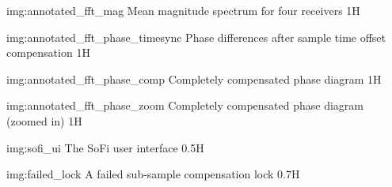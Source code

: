              {img:annotated_fft_mag}
             {Mean magnitude spectrum for four receivers}
             {1}{H}

             {img:annotated_fft_phase_timesync}
             {Phase differences after sample time offset compensation}
             {1}{H}

             {img:annotated_fft_phase_comp}
             {Completely compensated phase diagram}
             {1}{H}

             {img:annotated_fft_phase_zoom}
             {Completely compensated phase diagram (zoomed in)}
             {1}{H}

             {img:sofi_ui}
             {The SoFi user interface}
             {0.5}{H}

             {img:failed_lock}
             {A failed sub-sample compensation lock}
             {0.7}{H}
